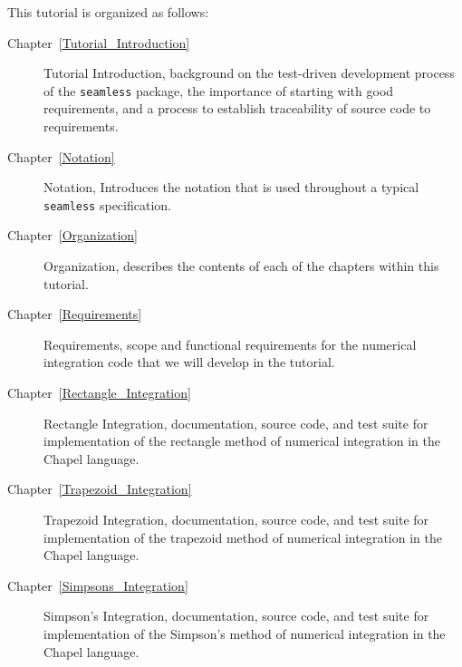\label{Organization}

This tutorial is organized as follows:

\begin{description}

  \item[Chapter~\ref{Tutorial_Introduction}] Tutorial Introduction, background on 
    the test-driven development process of the \lstinline{seamless} package, 
    the importance of starting with good requirements, and a process to establish
    traceability of source code to requirements.

  \item[Chapter~\ref{Notation}] Notation, Introduces the notation that is used
    throughout a typical \lstinline{seamless} specification.


  \item[Chapter~\ref{Organization}] Organization, describes the contents of
    each of the chapters within this tutorial.

  \item[Chapter~\ref{Requirements}] Requirements, scope and functional requirements for 
    the numerical integration code that we will develop in the tutorial.

  \item[Chapter~\ref{Rectangle_Integration}] Rectangle Integration, documentation, source
    code, and test suite for implementation of the rectangle method of numerical integration 
    in the Chapel language.

  \item[Chapter~\ref{Trapezoid_Integration}] Trapezoid Integration, documentation, source
    code, and test suite for implementation of the trapezoid method of numerical integration 
    in the Chapel language.

  \item[Chapter~\ref{Simpsons_Integration}] Simpson's Integration, documentation, source
    code, and test suite for implementation of the Simpson's method of numerical integration 
    in the Chapel language.

\end{description}
